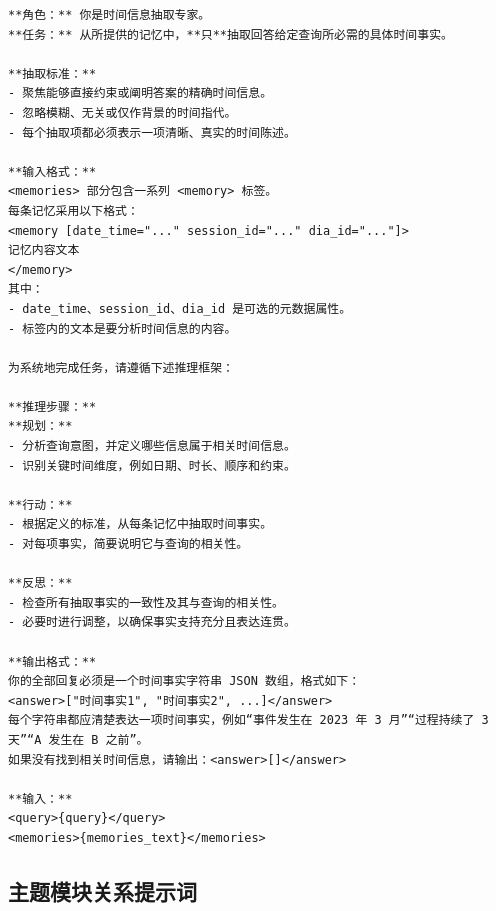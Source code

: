 \begin{center}
\begin{tcolorbox}[title={时间模块关系提示词（高）}]
\begin{Verbatim}[breaklines, breakanywhere, fontfamily=tt, fontseries=b, baselinestretch=0.95]
**角色：** 你是时间信息抽取专家。
**任务：** 从所提供的记忆中，**只**抽取回答给定查询所必需的具体时间事实。

**抽取标准：**
- 聚焦能够直接约束或阐明答案的精确时间信息。
- 忽略模糊、无关或仅作背景的时间指代。
- 每个抽取项都必须表示一项清晰、真实的时间陈述。

**输入格式：**
<memories> 部分包含一系列 <memory> 标签。
每条记忆采用以下格式：
<memory [date_time="..." session_id="..." dia_id="..."]>
记忆内容文本
</memory>
其中：
- date_time、session_id、dia_id 是可选的元数据属性。
- 标签内的文本是要分析时间信息的内容。

为系统地完成任务，请遵循下述推理框架：

**推理步骤：**
**规划：**
- 分析查询意图，并定义哪些信息属于相关时间信息。
- 识别关键时间维度，例如日期、时长、顺序和约束。

**行动：**
- 根据定义的标准，从每条记忆中抽取时间事实。
- 对每项事实，简要说明它与查询的相关性。

**反思：**
- 检查所有抽取事实的一致性及其与查询的相关性。
- 必要时进行调整，以确保事实支持充分且表达连贯。

**输出格式：**
你的全部回复必须是一个时间事实字符串 JSON 数组，格式如下：
<answer>["时间事实1", "时间事实2", ...]</answer>
每个字符串都应清楚表达一项时间事实，例如“事件发生在 2023 年 3 月”“过程持续了 3 天”“A 发生在 B 之前”。
如果没有找到相关时间信息，请输出：<answer>[]</answer>

**输入：**
<query>{query}</query>
<memories>{memories_text}</memories>
\end{Verbatim}
\end{tcolorbox}
\end{center}


\subsection{主题模块关系提示词}

